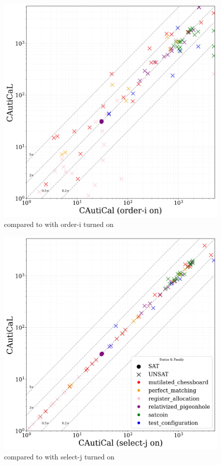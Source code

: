 \hfill    
\begin{subfigure}[t]{0.3\textwidth}
    \centering
    \includegraphics[width=\textwidth]{figs/globalisort_heuristic_comparison.jpg}
    \caption{\tool compared to \tool with \textsf{order-i} turned on}
    \label{fig:global-sort-i}
\end{subfigure}
\hfill
\begin{subfigure}[t]{0.3\textwidth}
    \centering
    \includegraphics[width=\textwidth]{figs/globaltouch_heuristic_comparison.jpg}
    \caption{\tool compared to \tool with \textsf{select-j} turned on}
    \label{fig:global-touched}
\end{subfigure}